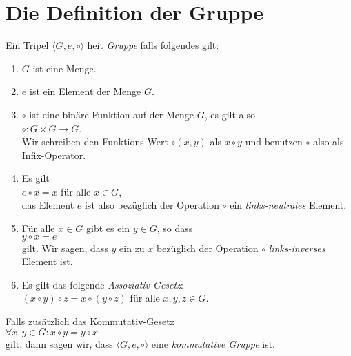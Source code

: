 \section{Die Definition der Gruppe}
\begin{Definition}[Gruppe]
Ein Tripel $\langle G, e, \circ \rangle$ hei\3t \emph{Gruppe} falls folgendes gilt:
\begin{enumerate}
\item $G$ ist eine Menge.
\item $e$ ist ein Element der Menge $G$.
\item $\circ$ ist eine bin\"{a}re Funktion auf der Menge $G$, es gilt also
      \\[0.2cm]
      \hspace*{1.3cm}
      $\circ : G \times G \rightarrow G$.
      \\[0.2cm]
      Wir schreiben den Funktions-Wert $\circ(x,y)$ als $x \circ y$ und benutzen
      $\circ$ also als Infix-Operator.
\item Es gilt
      \\
      \hspace*{1.3cm}
      $e \circ x = x$ \quad f\"{u}r alle $x \in G$,
      \\[0.2cm]
      das Element $e$ ist also bez\"{u}glich der Operation $\circ$ ein \emph{links-neutrales}
      Element.
\item F\"{u}r alle $x \in G$ gibt es ein $y \in G$, so dass
      \\[0.2cm]
      \hspace*{1.3cm}
      $y \circ x = e$
      \\[0.2cm]
      gilt.  Wir sagen, dass $y$ ein zu $x$ bez\"{u}glich der Operation $\circ$
      \emph{links-inverses} Element ist.
\item Es gilt das folgende \emph{Assoziativ-Gesetz}:
      \\[0.2cm]
      \hspace*{1.3cm}
      $(x \circ y) \circ z = x \circ (y \circ z)$ \quad f\"{u}r alle $x,y,z \in G$.
\end{enumerate}
Falls zus\"{a}tzlich das Kommutativ-Gesetz
\\[0.2cm]
\hspace*{1.3cm}
$\forall x, y \in G: x \circ y = y \circ x$
\\[0.2cm]
gilt, dann sagen wir, dass $\langle G, e, \circ \rangle$ eine \emph{kommutative Gruppe} ist.
\end{Definition}


